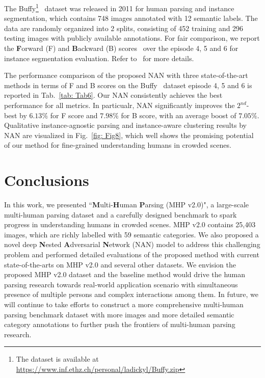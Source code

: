 \documentclass[10pt,twocolumn,letterpaper]{article}
\theoremstyle{definition}
\theoremstyle{remark}
\begin{document}
The Buffy\footnote{The dataset is available at \url{https://www.inf.ethz.ch/personal/ladickyl/Buffy.zip}}~\cite{vineet2011human} dataset was released in 2011 for human parsing and instance segmentation, which contains 748 images annotated with 12 semantic labels. The data are randomly organized into 2 splits, consisting of 452 training and 296 testing images with publicly available annotations. For fair comparison, we report the \textbf{F}orward (F) and \textbf{B}ackward (B) scores~\cite{jiang2016detangling} over the episode 4, 5 and 6 for instance segmentation evaluation. Refer to~\cite{vineet2011human, jiang2016detangling} for more details.

The performance comparison of the proposed NAN with three state-of-the-art methods in terms of F and B scores on the Buffy~\cite{vineet2011human} dataset episode 4, 5 and 6 is reported in Tab.~\ref{tab: Tab6}. Our NAN consistently achieves the best performance for all metrics. In particualr, NAN significantly improves the $2^{nd}$-best by $6.13\%$ for F score and $7.98\%$ for B score, with an average boost of $7.05\%$. Qualitative instance-agnostic parsing and instance-aware clustering results by NAN are visualized in Fig.~\ref{fig: Fig8}, which well shows the promising potential of our method for fine-grained understanding humans in crowded scenes.

\section{Conclusions}

In this work, we presented ``\textbf{M}ulti-\textbf{H}uman \textbf{P}arsing (MHP v2.0)", a large-scale multi-human parsing dataset and a carefully designed benchmark to spark progress in understanding humans in crowded scenes. MHP v2.0 contains 25{,}403 images, which are richly labelled with 59 semantic categories. We also proposed a novel deep \textbf{N}ested \textbf{A}dversarial \textbf{N}etwork (NAN) model to address this challenging problem and performed detailed evaluations of the proposed method with current state-of-the-arts on MHP v2.0 and several other datasets. We envision the proposed MHP v2.0 dataset and the baseline method would drive the human parsing research towards real-world application scenario with simultaneous presence of multiple persons and complex interactions among them. In future, we will continue to take efforts to construct a more comprehensive multi-human parsing benchmark dataset with more images and more detailed semantic category annotations to further push the frontiers of multi-human parsing research.
\end{document}
